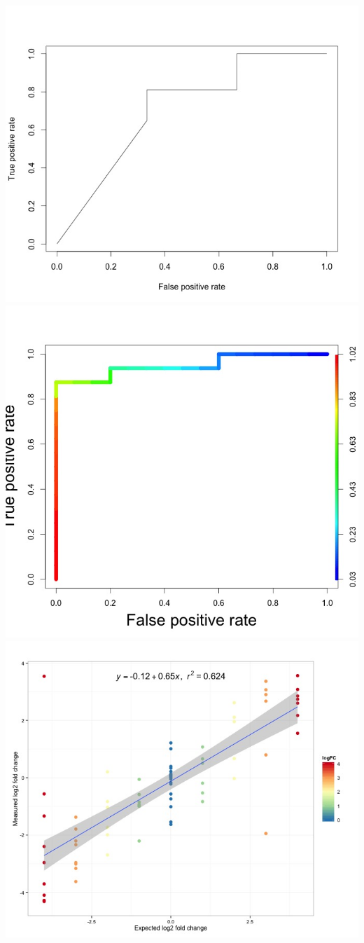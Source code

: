 \documentclass[]{article}
\begin{document}
\includegraphics{samples/ROCSample.jpeg}
\includegraphics{samples/ROCSampleColour.jpeg}
\includegraphics{samples/ScatterLFCSample.jpeg}
\end{document}
